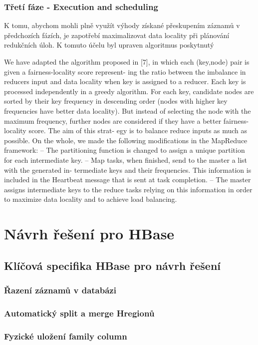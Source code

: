 \documentclass[thesis=M,czech]{FITthesis}[2012/06/26]
\begin{document}
\subsection{Třetí fáze - Execution and scheduling}
K tomu, abychom mohli plně využít výhody získané přeskupením záznamů v předchozích fázích, je zapotřebí maximalizovat data locality při plánování redukčních úloh. K tomuto účelu byl upraven algoritmus poskytnutý


We have adapted the algorithm proposed
in [7], in which each (key,node) pair is given a fairness-locality score represent-
ing the ratio between the imbalance in reducers input and data locality when
key is assigned to a reducer. Each key is processed independently in a greedy
algorithm. For each key, candidate nodes are sorted by their key frequency in
descending order (nodes with higher key frequencies have better data locality).
But instead of selecting the node with the maximum frequency, further nodes
are considered if they have a better fairness-locality score. The aim of this strat-
egy is to balance reduce inputs as much as possible. On the whole, we made the
following modifications in the MapReduce framework:
– The partitioning function is changed to assign a unique partition for each
intermediate key.
– Map tasks, when finished, send to the master a list with the generated in-
termediate keys and their frequencies. This information is included in the
Heartbeat message that is sent at task completion.
– The master assigns intermediate keys to the reduce tasks relying on this
information in order to maximize data locality and to achieve load balancing.


\chapter{Návrh řešení pro HBase}
\section{Klíčová specifika HBase pro návrh řešení}
\subsection{Řazení záznamů v databázi}
\subsection{Automatický split a merge Hregionů}
\subsection{Fyzické uložení family column}
\end{document}
